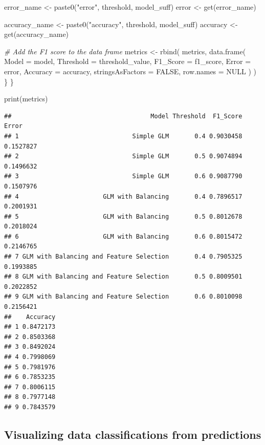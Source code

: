 \documentclass[
]{article}
\newenvironment{Shaded}{\begin{snugshade}}{\end{snugshade}}
\newcommand{\AttributeTok}[1]{\textcolor[rgb]{0.77,0.63,0.00}{#1}}
\newcommand{\CommentTok}[1]{\textcolor[rgb]{0.56,0.35,0.01}{\textit{#1}}}
\newcommand{\ConstantTok}[1]{\textcolor[rgb]{0.00,0.00,0.00}{#1}}
\newcommand{\FunctionTok}[1]{\textcolor[rgb]{0.00,0.00,0.00}{#1}}
\newcommand{\NormalTok}[1]{#1}
\newcommand{\OtherTok}[1]{\textcolor[rgb]{0.56,0.35,0.01}{#1}}
\newcommand{\StringTok}[1]{\textcolor[rgb]{0.31,0.60,0.02}{#1}}
\begin{document}
\begin{Shaded}
\begin{Highlighting}[]
\NormalTok{    error\_name }\OtherTok{\textless{}{-}} \FunctionTok{paste0}\NormalTok{(}\StringTok{"error"}\NormalTok{, threshold, model\_suff)}
\NormalTok{    error }\OtherTok{\textless{}{-}} \FunctionTok{get}\NormalTok{(error\_name)}
    
\NormalTok{    accuracy\_name }\OtherTok{\textless{}{-}} \FunctionTok{paste0}\NormalTok{(}\StringTok{"accuracy"}\NormalTok{, threshold, model\_suff)}
\NormalTok{    accuracy }\OtherTok{\textless{}{-}} \FunctionTok{get}\NormalTok{(accuracy\_name)}
    
    \CommentTok{\# Add the F1 score to the data frame}
\NormalTok{    metrics }\OtherTok{\textless{}{-}}
      \FunctionTok{rbind}\NormalTok{(}
\NormalTok{        metrics,}
        \FunctionTok{data.frame}\NormalTok{(}
          \AttributeTok{Model =}\NormalTok{ model,}
          \AttributeTok{Threshold =}\NormalTok{ threshold\_value,}
          \AttributeTok{F1\_Score =}\NormalTok{ f1\_score,}
          \AttributeTok{Error =}\NormalTok{ error,}
          \AttributeTok{Accuracy =}\NormalTok{ accuracy,}
          \AttributeTok{stringsAsFactors =} \ConstantTok{FALSE}\NormalTok{,}
          \AttributeTok{row.names =} \ConstantTok{NULL}
\NormalTok{        )}
\NormalTok{      )}
\NormalTok{  \}}
\NormalTok{\}}

\FunctionTok{print}\NormalTok{(metrics)}
\end{Highlighting}
\end{Shaded}

\begin{verbatim}
##                                      Model Threshold  F1_Score     Error
## 1                               Simple GLM       0.4 0.9030458 0.1527827
## 2                               Simple GLM       0.5 0.9074894 0.1496632
## 3                               Simple GLM       0.6 0.9087790 0.1507976
## 4                       GLM with Balancing       0.4 0.7896517 0.2001931
## 5                       GLM with Balancing       0.5 0.8012678 0.2018024
## 6                       GLM with Balancing       0.6 0.8015472 0.2146765
## 7 GLM with Balancing and Feature Selection       0.4 0.7905325 0.1993885
## 8 GLM with Balancing and Feature Selection       0.5 0.8009501 0.2022852
## 9 GLM with Balancing and Feature Selection       0.6 0.8010098 0.2156421
##    Accuracy
## 1 0.8472173
## 2 0.8503368
## 3 0.8492024
## 4 0.7998069
## 5 0.7981976
## 6 0.7853235
## 7 0.8006115
## 8 0.7977148
## 9 0.7843579
\end{verbatim}

\hypertarget{visualizing-data-classifications-from-predictions}{%
\subsection{Visualizing data classifications from
predictions}\label{visualizing-data-classifications-from-predictions}}
\end{document}
